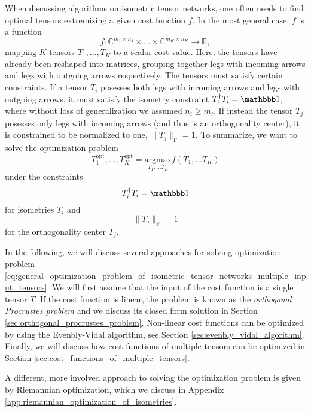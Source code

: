 When discussing algorithms on isometric tensor networks, one often needs to find optimal tensors extremizing a given cost function $f$. In the most general case, $f$ is a function
\begin{equation}
	\label{eq:general_optimization_problem_of_isometric_tensor_networks_cost_function_multiple_input_tensors}
	f:\mathbb{C}^{m_1\times n_1}\times \dots \times \mathbb{C}^{m_K\times n_K} \to \mathbb{R},
\end{equation}
mapping $K$ tensors $T_1,\dots,T_K$ to a scalar cost value. Here, the tensors have already been reshaped into matrices, grouping together legs with incoming arrows and legs with outgoing arrows respectively. The tensors must satisfy certain constraints. If a tensor $T_i$ posesses both legs with incoming arrows and legs with outgoing arrows, it must satisfy the isometry constraint $T_i^\dagger T_i = \id$, where without loss of generalization we assumed $n_i \ge m_i$. If instead the tensor $T_j$ posesses only legs with incoming arrows (and thus is an orthogonality center), it is constrained to be normalized to one, $\lVert T_j\rVert_\text{F} = 1$. To summarize, we want to solve the optimization problem
\begin{equation}
	\label{eq:general_optimization_problem_of_isometric_tensor_networks_multiple_input_tensors}
	T_1^\text{opt}, \dots, T_K^\text{opt} = \underset{T_1,\dots T_K}{\text{argmax}}f\left(T_1, \dots T_K\right)
\end{equation}
under the constraints
\begin{equation}
	\label{eq:general_optimization_problem_of_isometric_tensor_networks_isometry_constraint}
	T_i^\dagger T_i = \id
\end{equation}
for isometries $T_i$ and
\begin{equation}
	\label{eq:general_optimization_problem_of_isometric_tensor_networks_ortho_center_constraint}
	\lVert T_j\rVert_\text{F} = 1
\end{equation}
for the orthogonality center $T_j$. \par
In the following, we will discuss several approaches for solving optimization problem \eqref{eq:general_optimization_problem_of_isometric_tensor_networks_multiple_input_tensors}. We will first assume that the input of the cost function is a single tensor $T$. If the cost function is linear, the problem is known as the \textit{orthogonal Procrustes problem} and we discuss its closed form solution in Section \ref{sec:orthogonal_procrustes_problem}. Non-linear cost functions can be optimized by using the Evenbly-Vidal algorithm, see Section \ref{sec:evenbly_vidal_algorithm}. Finally, we will discuss how cost functions of multiple tensors can be optimized in Section \ref{sec:cost_functions_of_multiple_tensors}. \par
A different, more involved approach to solving the optimization problem is given by Riemannian optimization, which we discuss in Appendix \ref{app:riemannian_optimization_of_isometries}.

